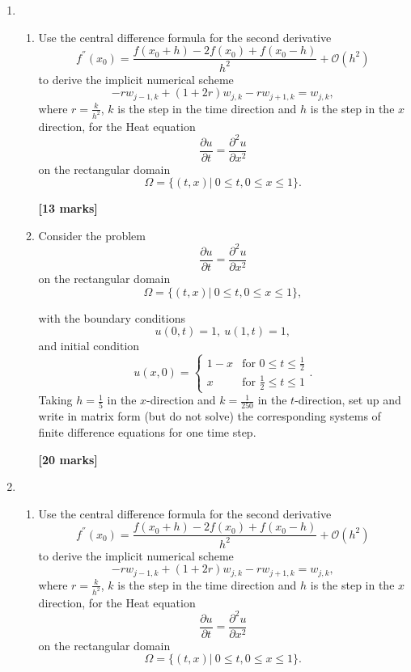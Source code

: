 \begin{enumerate}
	\item 
\begin{enumerate}
	
	\item 
	Use the central difference formula for the second derivative 
	\[ f^{''}(x_0)=\frac{f(x_0+h)-2f(x_0)+f(x_0-h)}{h^2}+\mathcal{O}(h^2)\]
	to derive the implicit numerical scheme
	\[-rw_{j-1,k}+(1+2r)w_{j,k}-rw_{j+1,k}=w_{j,k},\]
	where $r=\frac{k}{h^2}$, $k$ is the step in the time direction and $h$ is the step in the $x$ direction, 
	for the Heat equation 
	\[\frac{\partial u}{\partial t}=\frac{\partial^2 u}{\partial x^2} \]
	on the rectangular domain
		\[\Omega=\{(t,x)| \ 0\leq t, 0 \leq x \leq 1\}. \]

\begin{flushright}
\textbf{[13 marks]}
\end{flushright}
	
	\item Consider the problem
	\[\frac{\partial u}{\partial t}=\frac{\partial^2 u}{\partial x^2} \]
	on the rectangular domain
		\[\Omega=\{(t,x)| \ 0\leq t, 0 \leq x \leq 1\},\]

	with the boundary conditions
	\[ u(0,t)=1, \ u(1,t)=1,   \]
	and initial condition
	\[	u(x,0)=\begin{cases}
	1-x & \text{for }0\leq t \leq \frac{1}{2}\\
	x & \text{for } \frac{1}{2}\leq t \leq 1
	\end{cases}. \]
		Taking $h=\frac{1}{5}$ in the $x$-direction and $k=\frac{1}{250}$ in the $t$-direction, set up and write in matrix form (but do not solve) the corresponding systems of finite difference equations for one time step.\\
\begin{flushright}
\textbf{[20 marks]}

\end{flushright}
	
	
\end{enumerate}

	\item 
\begin{enumerate}
	
	\item 
	Use the central difference formula for the second derivative 
	\[ f^{''}(x_0)=\frac{f(x_0+h)-2f(x_0)+f(x_0-h)}{h^2}+\mathcal{O}(h^2)\]
	to derive the implicit numerical scheme
	\[-rw_{j-1,k}+(1+2r)w_{j,k}-rw_{j+1,k}=w_{j,k},\]
	where $r=\frac{k}{h^2}$, $k$ is the step in the time direction and $h$ is the step in the $x$ direction, 
	for the Heat equation 
	\[\frac{\partial u}{\partial t}=\frac{\partial^2 u}{\partial x^2} \]
	on the rectangular domain
		\[\Omega=\{(t,x)| \ 0\leq t, 0 \leq x \leq 1\}. \]


\end{enumerate}
\end{enumerate}
